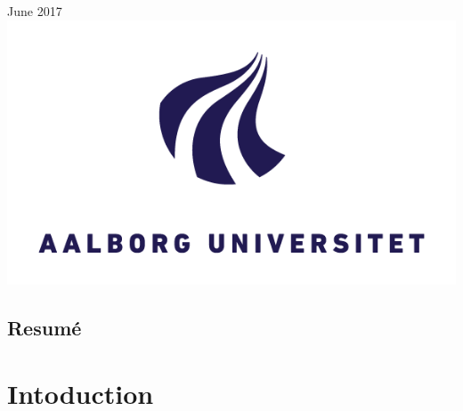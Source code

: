 \documentclass[a4paper]{report}
\theoremstyle{plain}
\begin{document}
\begin{titlepage}


{\large June 2017}\\[2cm] %


\includegraphics{AAU_LOGO.png}\\[1cm] %
 

\vfill %

\end{titlepage}



\chapter*{Resumé}

\clearpage

\tableofcontents


\part{Intoduction}
\clearpage
\end{document}
